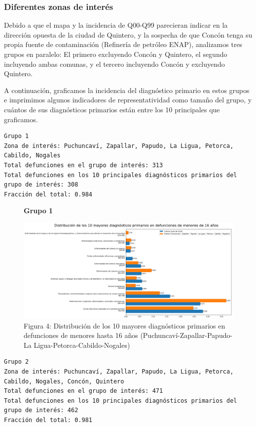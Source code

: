 \documentclass[]{article}
\begin{document}
\hypertarget{diferentes-zonas-de-interuxe9s}{%
\subsubsection{Diferentes zonas de
interés}\label{diferentes-zonas-de-interuxe9s}}

Debido a que el mapa y la incidencia de Q00-Q99 parecieran indicar en la
dirección opuesta de la ciudad de Quintero, y la sospecha de que Concón
tenga su propia fuente de contaminación (Refinería de petróleo ENAP),
analizamos tres grupos en paralelo: El primero excluyendo Concón y
Quintero, el segundo incluyendo ambas comunas, y el tercero incluyendo
Concón y excluyendo Quintero.

A continuación, graficamos la incidencia del diagnóstico primario en estos grupos e imprimimos
algunos indicadores de representatividad como tamaño del grupo, y
cuántos de sus diagnósticos primarios están entre los 10 principales que
graficamos.

\begin{verbatim}
Grupo 1
Zona de interés: Puchuncaví, Zapallar, Papudo, La Ligua, Petorca, Cabildo, Nogales
Total defunciones en el grupo de interés: 313
Total defunciones en los 10 principales diagnósticos primarios del grupo de interés: 308
Fracción del total: 0.984
\end{verbatim}

\begin{figure}
\centering
\textbf{Grupo 1}\par\medskip
\includegraphics{assets/10-diagnosticos-(Puchuncavi-Zapallar-Papudo-LaLigua-Petorca-Cabildo-Nogales).png}
\caption{Figura 4: Distribución de los 10 mayores diagnósticos primarios en defunciones de menores hasta 16 años (Puchuncaví-Zapallar-Papudo-La Ligua-Petorca-Cabildo-Nogales)}
\end{figure}

\begin{verbatim}
Grupo 2
Zona de interés: Puchuncaví, Zapallar, Papudo, La Ligua, Petorca, Cabildo, Nogales, Concón, Quintero
Total defunciones en el grupo de interés: 471
Total defunciones en los 10 principales diagnósticos primarios del grupo de interés: 462
Fracción del total: 0.981
\end{verbatim}
\end{document}
